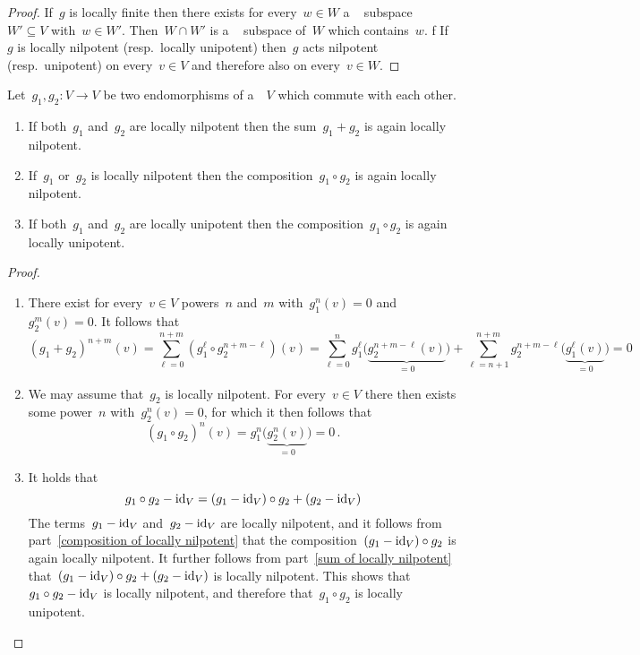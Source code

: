 \begin{proof}
  If~$g$ is locally finite then there exists for every~$w \in W$ a {\fd}~ subspace~$W' \subseteq V$ with~$w \in W'$.
  Then~$W \cap W'$ is a {\fd}~ subspace of~$W$ which contains~$w$.
  f 
  If~$g$ is locally nilpotent (resp.\ locally unipotent) then~$g$ acts nilpotent (resp.\ unipotent) on every~$v \in V$ and therefore also on every~$v \in W$.
\end{proof}


\begin{lemma}
  \label{combination of locally potent endomorphisms}
  Let~$g_1, g_2 \colon V \to V$ be two endomorphisms of a~{\kvs}~$V$ which commute with each other.
  \begin{enumerate}
    \item
      \label{sum of locally nilpotent}
      If both~$g_1$ and~$g_2$ are locally nilpotent then the sum~$g_1 + g_2$ is again locally nilpotent.
    \item
      \label{composition of locally nilpotent}
      If~$g_1$ or~$g_2$ is locally nilpotent then the composition~$g_1 \circ g_2$ is again locally nilpotent.
    \item
      \label{composition of locally uinpotent}
      If both~$g_1$ and~$g_2$ are locally unipotent then the composition~$g_1 \circ g_2$ is again locally unipotent.
  \end{enumerate}
\end{lemma}


\begin{proof}
  \leavevmode
  \begin{enumerate}
    \item
      There exist for every~$v \in V$ powers~$n$ and~$m$ with~$g_1^n(v) = 0$ and~$g_2^m(v) = 0$.
      It follows that
      \[
          (g_1 + g_2)^{n+m}(v)
        = \sum_{\ell=0}^{n+m} \left( g_1^\ell \circ g_2^{n+m-\ell} \right)(v)
        =   \sum_{\ell=0}^n g_1^\ell \bigl( \underbrace{g_2^{n+m-\ell}(v)}_{=0} \bigr)
          + \sum_{\ell=n+1}^{n+m} g_2^{n+m-\ell} \bigl( \underbrace{g_1^\ell(v)}_{=0} \bigr)
        = 0
      \]
    \item
      We may assume that~$g_2$ is locally nilpotent.
      For every~$v \in V$ there then exists some power~$n$ with~$g_2^n(v) = 0$, for which it then follows that
      \[
          (g_1 \circ g_2)^n(v)
        = g_1^n\bigl( \underbrace{g_2^n(v)}_{=0} \bigr)
        = 0 \,.
      \]
    \item
      It holds that
      \[
          g_1 \circ g_2 - \operatorname{id}_V
        = (g_1 - \operatorname{id}_V) \circ g_2 + (g_2 - \operatorname{id}_V)
      \]
      The terms~$g_1 - \operatorname{id}_V$ and~$g_2 - \operatorname{id}_V$ are locally nilpotent, and it follows from part~\ref*{composition of locally nilpotent} that the composition~$(g_1 - \operatorname{id}_V) \circ g_2$ is again locally nilpotent.
      It further follows from part~\ref*{sum of locally nilpotent} that~$(g_1 - \operatorname{id}_V) \circ g_2 + (g_2 - \operatorname{id}_V)$ is locally nilpotent.
      This shows that~$g_1 \circ g_2 - \operatorname{id}_V$ is locally nilpotent, and therefore that~$g_1 \circ g_2$ is locally unipotent.
    \qedhere
  \end{enumerate}
\end{proof}


